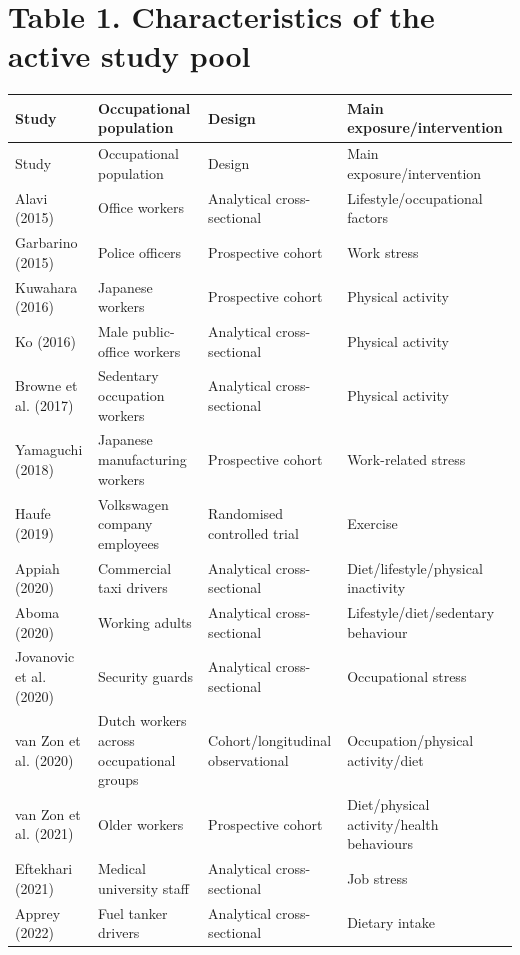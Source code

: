 \section*{Table 1. Characteristics of the active study pool}

\begin{longtable}{p{} p{} p{} p{}}
\toprule
Study & Occupational population & Design & Main exposure/intervention \\
\midrule
\endfirsthead
\toprule
Study & Occupational population & Design & Main exposure/intervention \\
\midrule
\endhead
    Alavi (2015) & Office workers & Analytical cross-sectional & Lifestyle/occupational factors \\
    Garbarino (2015) & Police officers & Prospective cohort & Work stress \\
    Kuwahara (2016) & Japanese workers & Prospective cohort & Physical activity \\
    Ko (2016) & Male public-office workers & Analytical cross-sectional & Physical activity \\
    Browne et al. (2017) & Sedentary occupation workers & Analytical cross-sectional & Physical activity \\
    Yamaguchi (2018) & Japanese manufacturing workers & Prospective cohort & Work-related stress \\
    Haufe (2019) & Volkswagen company employees & Randomised controlled trial & Exercise \\
    Appiah (2020) & Commercial taxi drivers & Analytical cross-sectional & Diet/lifestyle/physical inactivity \\
    Aboma (2020) & Working adults & Analytical cross-sectional & Lifestyle/diet/sedentary behaviour \\
    Jovanovic et al. (2020) & Security guards & Analytical cross-sectional & Occupational stress \\
    van Zon et al. (2020) & Dutch workers across occupational groups & Cohort/longitudinal observational & Occupation/physical activity/diet \\
    van Zon et al. (2021) & Older workers & Prospective cohort & Diet/physical activity/health behaviours \\
    Eftekhari (2021) & Medical university staff & Analytical cross-sectional & Job stress \\
    Apprey (2022) & Fuel tanker drivers & Analytical cross-sectional & Dietary intake \\

\end{longtable}
